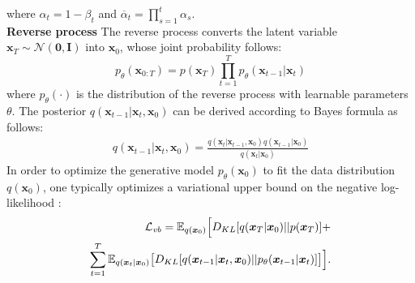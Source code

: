 \documentclass[lettersize,journal]{IEEEtran}
\begin{document}
where $\alpha_t=1-\beta_t$ and $\overline{\alpha}_t= \prod_{s=1}^{t} \alpha_s$. \\
\textbf{Reverse process}
The reverse process converts the latent variable $\boldsymbol{x}_T \sim \mathcal{N}(\boldsymbol{0},\boldsymbol{I}) $ into $\boldsymbol{x}_0$, whose joint probability follows:
\begin{equation}\label{forward process}
   p_{\theta}(\boldsymbol{x}_{0:T})=p(\boldsymbol{x}_T) \prod_{t=1}^{T} p_{\theta}(\boldsymbol{x}_{t-1}|\boldsymbol{x}_t)
\end{equation}
where $p_{\theta}(\cdot)$ is the distribution of the reverse process with learnable parameters $\theta$. The posterior $q(\boldsymbol{x}_{t-1}|\boldsymbol{x}_t,\boldsymbol{x}_0)$ can be derived according to Bayes formula as follows:
{\color{black}
\begin{equation}\label{bayespost}
\begin{aligned}
    q(\boldsymbol{x}_{t-1}|\boldsymbol{x}_{t},\boldsymbol{x}_{0})= \frac{q(\boldsymbol{x}_t|\boldsymbol{x}_{t-1},\boldsymbol{x}_0)q(\boldsymbol{x}_{t-1}|\boldsymbol{x}_0)}{q(\boldsymbol{x}_t|\boldsymbol{x}_0)} 
\end{aligned}
\end{equation}
}
In order to optimize the generative model $p_{\theta}(\boldsymbol{x}_0)$ to fit the data distribution $q(\boldsymbol{x}_0)$, one typically optimizes a variational upper bound on the negative log-likelihood {}:
\begin{equation}\label{vqvae loss}
\begin{aligned}
    \mathcal{L}_{\mathit{vb}} =  \mathbb{E}_{q(\boldsymbol{x}_0)} \Big{[}   D_{KL} [ q(\boldsymbol{x}_T|\boldsymbol{x}_0)||p(\boldsymbol{x}_T) ]   + \\  
    \sum_{t=1}^{T}   \mathbb{E}_{q(\boldsymbol{x}_t|\boldsymbol{x}_0)} \big{[}D_{KL}[q(\boldsymbol{x}_{t-1}|\boldsymbol{x}_t,\boldsymbol{x}_0)||p_{\theta}(\boldsymbol{x}_{t-1}|\boldsymbol{x}_t)] \big{]} \Big{]}. 
\end{aligned}
\end{equation}
\end{document}
